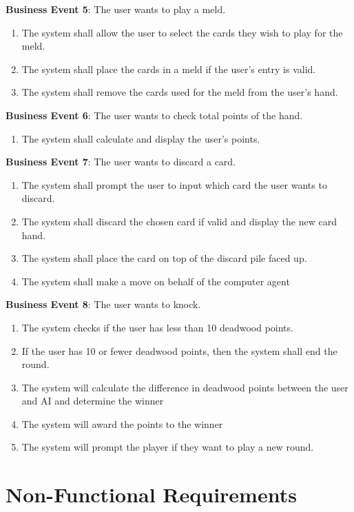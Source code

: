 \documentclass[12pt, titlepage]{article}
\begin{document}
\textbf{Business Event 5}: The user wants to play a meld. 
\begin{enumerate}
    \item The system shall allow the user to select the cards they wish to play for the meld.
    \item The system shall place the cards in a meld if the user's entry is valid.
    \item The system shall remove the cards used for the meld from the user's hand.
\end{enumerate}

\textbf{Business Event 6}: The user wants to check total points of the hand.
\begin{enumerate}
    \item The system shall calculate and display the user's points.
\end{enumerate}

\textbf{Business Event 7}: The user wants to discard a card.
\begin{enumerate}
    \item The system shall prompt the user to input which card the user wants to discard.
    \item The system shall discard the chosen card if valid and display the new card hand.
    \item The system shall place the card on top of the discard pile faced up.
    \item The system shall make a move on behalf of the computer agent
\end{enumerate}

\textbf{Business Event 8}: The user wants to knock.
\begin{enumerate}
    \item The system checks if the user has less than 10 deadwood points.
    \item If the user has 10 or fewer deadwood points, then the system shall end the round. 
    \item The system will calculate the difference in deadwood points between the user and AI and determine the winner
    \item The system will award the points to the winner
    \item The system will prompt the player if they want to play a new round.
\end{enumerate}

\section{Non-Functional Requirements}
\end{document}
